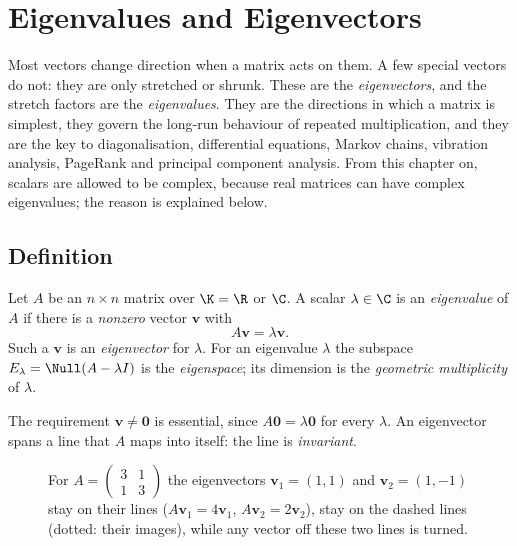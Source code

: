 \chapter{Eigenvalues and Eigenvectors}

Most vectors change direction when a matrix acts on them. A few special vectors do not: they are only stretched or shrunk. These are the \emph{eigenvectors}, and the stretch factors are the \emph{eigenvalues}. They are the directions in which a matrix is simplest, they govern the long-run behaviour of repeated multiplication, and they are the key to diagonalisation, differential equations, Markov chains, vibration analysis, PageRank and principal component analysis. From this chapter on, scalars are allowed to be complex, because real matrices can have complex eigenvalues; the reason is explained below.

\section{Definition}

\begin{definition}
Let $A$ be an $n\times n$ matrix over $\K=\R$ or $\C$. A scalar $\lambda\in\C$ is an \emph{eigenvalue} of $A$ if there is a \emph{nonzero} vector $\mathbf{v}$ with
\[ A\mathbf{v}=\lambda\mathbf{v}. \]
Such a $\mathbf{v}$ is an \emph{eigenvector} for $\lambda$. For an eigenvalue $\lambda$ the subspace $E_\lambda=\Null(A-\lambda I)$ is the \emph{eigenspace}; its dimension is the \emph{geometric multiplicity} of $\lambda$.
\end{definition}

The requirement $\mathbf{v}\ne\mathbf{0}$ is essential, since $A\mathbf{0}=\lambda\mathbf{0}$ for every $\lambda$. An eigenvector spans a line that $A$ maps into itself: the line is \emph{invariant}.

\begin{figure}[h]
\centering
{}
\caption{For $A=\begin{pmatrix}3&1\\1&3\end{pmatrix}$ the eigenvectors $\mathbf{v}_1=(1,1)$ and $\mathbf{v}_2=(1,-1)$ stay on their lines ($A\mathbf{v}_1=4\mathbf{v}_1$, $A\mathbf{v}_2=2\mathbf{v}_2$), stay on the dashed lines (dotted: their images), while any vector off these two lines is turned.}
\end{figure}

